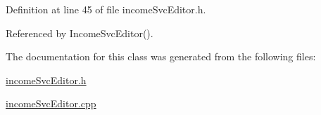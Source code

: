 Definition at line 45 of file income\-Svc\-Editor.h.

Referenced by Income\-Svc\-Editor().

The documentation for this class was generated from the following files:\begin{CompactItemize}
\item 
\hyperlink{incomeSvcEditor_8h}{income\-Svc\-Editor.h}\item 
\hyperlink{incomeSvcEditor_8cpp}{income\-Svc\-Editor.cpp}\end{CompactItemize}

